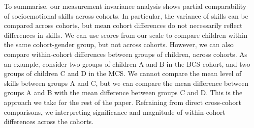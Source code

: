 To summarise, our measurement invariance analysis shows partial comparability of socioemotional skills across cohorts. In particular, the variance of skills can be compared across cohorts, but mean cohort differences do not necessarily reflect differences in skills. We can use scores from our scale to compare children within the same cohort-gender group, but not across cohorts. However, we can also compare within-cohort differences between groups of children, across cohorts. As an example, consider two groups of children A and B in the BCS cohort, and two groups of children C and D in the MCS. We cannot compare the mean level of skills between groups A and C, but we can compare the mean difference between groups A and B with the mean difference between groups C and D. This is the approach we take for the rest of the paper. Refraining from direct cross-cohort comparisons, we interpreting significance and magnitude of within-cohort differences across the cohorts.
